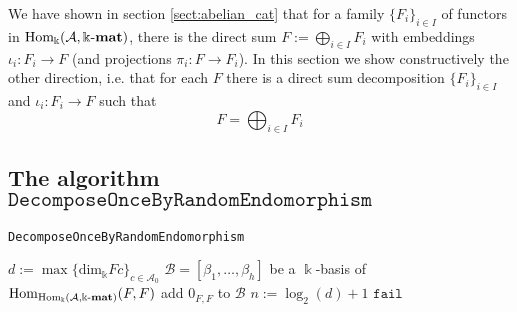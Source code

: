 
We have shown in section \ref{sect:abelian_cat} that for a family $\{F_{i}\}_{i\in I}$ of functors in $\mathrm{Hom_{\Bbbk}}(\mathcal{A},\Bbbk\textnormal{-}\mathbf{mat})$, there is the
direct sum $F := \bigoplus_{i\in I} F_{i}$ with embeddings $\iota_{i} : F_{i} \rightarrow F$ (and projections $\pi_{i} : F \rightarrow F_{i}$).
In this section we show constructively the other direction, i.e. that for each $F$ there is a direct sum decomposition
$\{F_{i}\}_{i\in I}$ and $\iota_{i} : F_{i} \rightarrow F$ such that
\[
F = \bigoplus_{i\in I} F_{i}
\]

\subsection{The algorithm $\mathtt{DecomposeOnceByRandomEndomorphism}$}

\begin{algorithm}[H]\capstart
    \caption{\texttt{DecomposeOnceByRandomEndomorphism}}\label{algo:DecomposeOnceByRandomEndomorphism}
	\BlankLine
	$d := \max \{ \mathrm{dim}_{\Bbbk}Fc \}_{c \in \mathcal{A}_{0}}$\;
	$\mathcal{B} = [\beta_{1},\dots,\beta_{h}]$ be a $\Bbbk$-basis of $\mathrm{Hom}_{\mathrm{Hom_{\Bbbk}}(\mathcal{A},\Bbbk\textnormal{-}\mathbf{mat})}(F,F)$\;
	add $0_{F,F}$ to $\mathcal{B}$\;
	$n := \log_{2}(d) + 1$\;
	\BlankLine
	\BlankLine
	\Return $\mathtt{fail}$
\end{algorithm}

